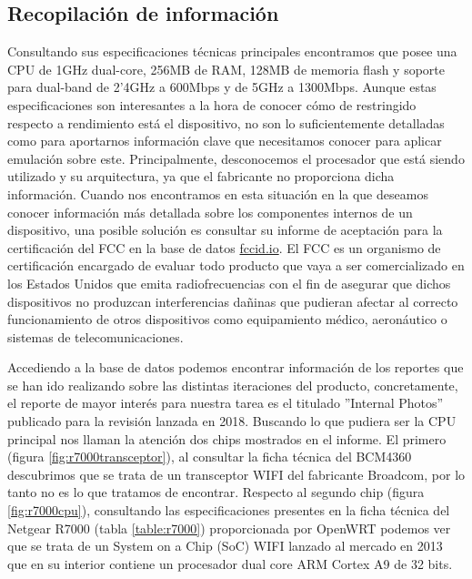 \subsection{Recopilación de información}\label{r7000_section}
Consultando sus especificaciones técnicas principales 
encontramos que posee una CPU de 1GHz dual-core, 256MB de RAM, 128MB de memoria flash y soporte para dual-band de 2'4GHz a 600Mbps y de 5GHz a 
1300Mbps. Aunque estas especificaciones son interesantes a la hora de conocer cómo de restringido respecto a rendimiento está el dispositivo,
no son lo suficientemente detalladas como para aportarnos información clave que necesitamos conocer para aplicar emulación sobre este.
Principalmente, desconocemos el procesador que está siendo utilizado y su arquitectura, ya que el fabricante no proporciona dicha información.
Cuando nos encontramos en esta situación en la que deseamos conocer información más detallada sobre los componentes internos de un dispositivo, 
una posible solución es consultar su informe de aceptación para la certificación del FCC\cite{fcc} en la base de datos \hyperlink{fccid.io}{fccid.io}.
El FCC es un organismo de certificación encargado de evaluar todo producto que vaya a ser comercializado en los Estados Unidos que emita 
radiofrecuencias con el fin de asegurar que dichos dispositivos no produzcan interferencias dañinas que pudieran afectar al correcto
funcionamiento de otros dispositivos como equipamiento médico, aeronáutico o sistemas de telecomunicaciones.\bigskip

Accediendo a la base de datos podemos encontrar información de los reportes que se han ido realizando sobre las distintas iteraciones del producto,
concretamente, el reporte de mayor interés para nuestra tarea es el titulado ''Internal Photos'' publicado para la revisión lanzada en 2018\cite{netgearFCCid}.
Buscando lo que pudiera ser la CPU principal nos llaman la atención dos chips mostrados en el informe. El primero (figura \ref{fig:r7000transceptor}), al 
consultar la ficha técnica del BCM4360 descubrimos que se trata de un transceptor WIFI del fabricante Broadcom, por lo tanto no es lo que tratamos de 
encontrar. Respecto al segundo chip (figura \ref{fig:r7000cpu}), consultando las especificaciones presentes en la ficha técnica del Netgear R7000 
(tabla \ref{table:r7000}) proporcionada por OpenWRT podemos ver que se trata de un System on a Chip (SoC) WIFI lanzado al mercado en 2013\cite{broadcomSOCs} 
que en su interior contiene un procesador dual core ARM Cortex A9 de 32 bits.

